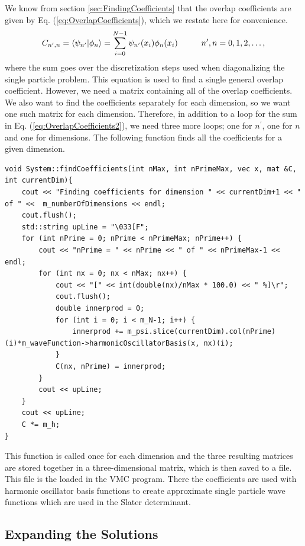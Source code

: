 \documentclass[../main.tex]{subfiles}
\begin{document}
We know from section \ref{sec:FindingCoefficients} that the overlap coefficients are given by Eq. (\ref{eq:OverlapCoefficients}), which we restate here for convenience.
\begin{equation}\label{eq:OverlapCoefficients2}
    C_{n^\prime,n} = \langle \psi_{n^\prime} \vert \phi_n\rangle = \sum_{i=0}^{N-1} \psi_{n^\prime}(x_i)\phi_n(x_i) \hspace{1 cm} n^\prime,n = 0,1,2,\dots,
\end{equation}
where the sum goes over the discretization steps used when diagonalizing the single particle problem. This equation is used to find a single general overlap coefficient. However, we need a matrix containing all of the overlap coefficients. We also want to find the coefficients separately for each dimension, so we want one such matrix for each dimension. Therefore, in addition to a loop for the sum in Eq. (\ref{eq:OverlapCoefficients2}), we need three more loops; one for $n^\prime$, one for $n$ and one for dimensions. The following function finds all the coefficients for a given dimension.
\lstset{language=c++}
\begin{lstlisting}[caption={}]
void System::findCoefficients(int nMax, int nPrimeMax, vec x, mat &C, int currentDim){
    cout << "Finding coefficients for dimension " << currentDim+1 << " of " <<  m_numberOfDimensions << endl;
    cout.flush();
    std::string upLine = "\033[F";
    for	(int nPrime = 0; nPrime < nPrimeMax; nPrime++) {
        cout << "nPrime = " << nPrime << " of " << nPrimeMax-1 << endl;
        for (int nx = 0; nx < nMax; nx++) {
            cout << "[" << int(double(nx)/nMax * 100.0) << " %]\r";
            cout.flush();
            double innerprod = 0;
            for (int i = 0; i < m_N-1; i++) {
                innerprod += m_psi.slice(currentDim).col(nPrime)(i)*m_waveFunction->harmonicOscillatorBasis(x, nx)(i);
            }
            C(nx, nPrime) = innerprod;
        }
        cout << upLine;
    }
    cout << upLine;
    C *= m_h;
}
\end{lstlisting}
This function is called once for each dimension and the three resulting matrices are stored together in a three-dimensional matrix, which is then saved to a file. This file is the loaded in the VMC program. There the coefficients are used with harmonic oscillator basis functions to create approximate single particle wave functions which are used in the Slater determinant.

\subsection{Expanding the Solutions}
\end{document}
